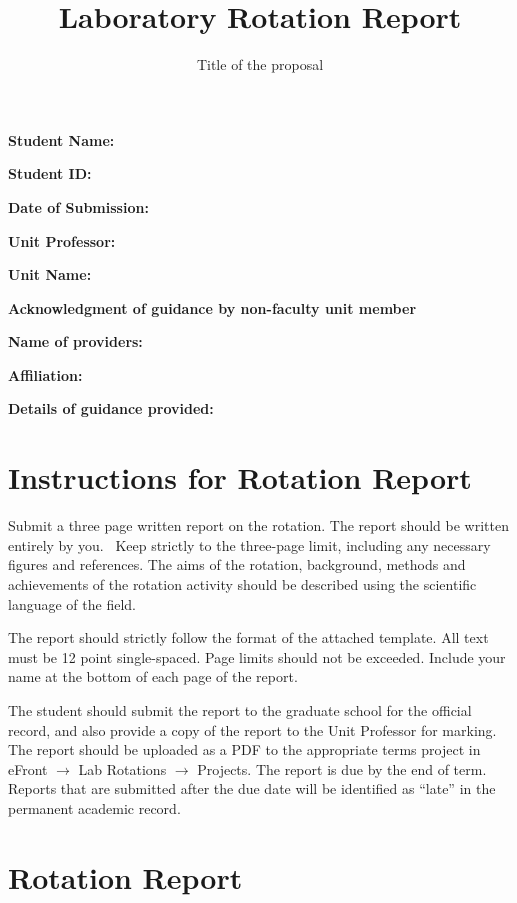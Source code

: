 \documentclass[paper=a4wide, fontsize=12pt]{scrartcl}	 %
\title{\vspace{-1.8cm}  \color{DarkRed} Laboratory Rotation Report}
\subtitle{Title of the proposal %
\vspace{-2cm} }
\date{} %
\begin{document}
\maketitle %
\thispagestyle{fancy} %


\vspace{-0.5cm} \textbf{Student Name:}  

\textbf{Student ID:} 

\textbf{Date of Submission:}

\textbf{Unit Professor:} 

\textbf{Unit Name:} 				

\vspace{3mm} \textbf{Acknowledgment of guidance by non-faculty unit member} 

\textbf{Name of providers:}

\textbf{Affiliation:}

\textbf{Details of guidance provided:}	


\vspace{0.5cm}

\section*{Instructions for Rotation Report}

Submit a three page written report on the rotation. The report should be written entirely by you.  Keep strictly to the three-page limit, including any necessary figures and references. The aims of the rotation, background, methods and achievements of the rotation activity should be described using the scientific language of the field.

The report should strictly follow the format of the attached template. All text must be 12 point single-spaced. Page limits should not be exceeded. Include your name at the bottom of each page of the report.

 The student should submit the report to the graduate school for the official record, and also provide a copy of the report to the Unit Professor for marking. The report should be uploaded as a PDF to the appropriate terms project in eFront $\rightarrow$ Lab Rotations  $\rightarrow$ Projects. The report is due by the end of term. Reports that are submitted after the due date will be identified as ``late'' in the permanent academic record.


\section*{Rotation Report}
\end{document}

